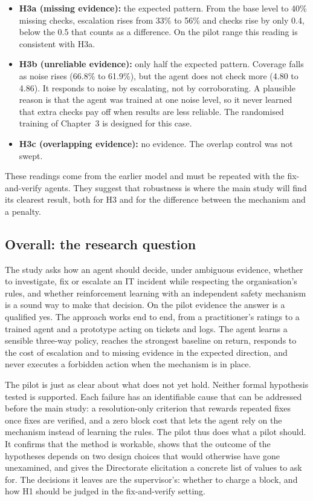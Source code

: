 \documentclass[11pt,a4paper]{article}
\begin{document}
\begin{itemize}
  \item \textbf{H3a (missing evidence):} the expected pattern. From the base level to 40\% missing checks, escalation rises from 33\% to 56\% and checks rise by only 0.4, below the 0.5 that counts as a difference. On the pilot range this reading is consistent with H3a.
  \item \textbf{H3b (unreliable evidence):} only half the expected pattern. Coverage falls as noise rises (66.8\% to 61.9\%), but the agent does not check more (4.80 to 4.86). It responds to noise by escalating, not by corroborating. A plausible reason is that the agent was trained at one noise level, so it never learned that extra checks pay off when results are less reliable. The randomised training of Chapter~3 is designed for this case.
  \item \textbf{H3c (overlapping evidence):} no evidence. The overlap control was not swept.
\end{itemize}

These readings come from the earlier model and must be repeated with the fix-and-verify agents. They suggest that robustness is where the main study will find its clearest result, both for H3 and for the difference between the mechanism and a penalty.

\subsection{Overall: the research question}

The study asks how an agent should decide, under ambiguous evidence, whether to investigate, fix or escalate an IT incident while respecting the organisation's rules, and whether reinforcement learning with an independent safety mechanism is a sound way to make that decision. On the pilot evidence the answer is a qualified yes. The approach works end to end, from a practitioner's ratings to a trained agent and a prototype acting on tickets and logs. The agent learns a sensible three-way policy, reaches the strongest baseline on return, responds to the cost of escalation and to missing evidence in the expected direction, and never executes a forbidden action when the mechanism is in place.

The pilot is just as clear about what does not yet hold. Neither formal hypothesis tested is supported. Each failure has an identifiable cause that can be addressed before the main study: a resolution-only criterion that rewards repeated fixes once fixes are verified, and a zero block cost that lets the agent rely on the mechanism instead of learning the rules. The pilot thus does what a pilot should. It confirms that the method is workable, shows that the outcome of the hypotheses depends on two design choices that would otherwise have gone unexamined, and gives the Directorate elicitation a concrete list of values to ask for. The decisions it leaves are the supervisor's: whether to charge a block, and how H1 should be judged in the fix-and-verify setting.
\end{document}
